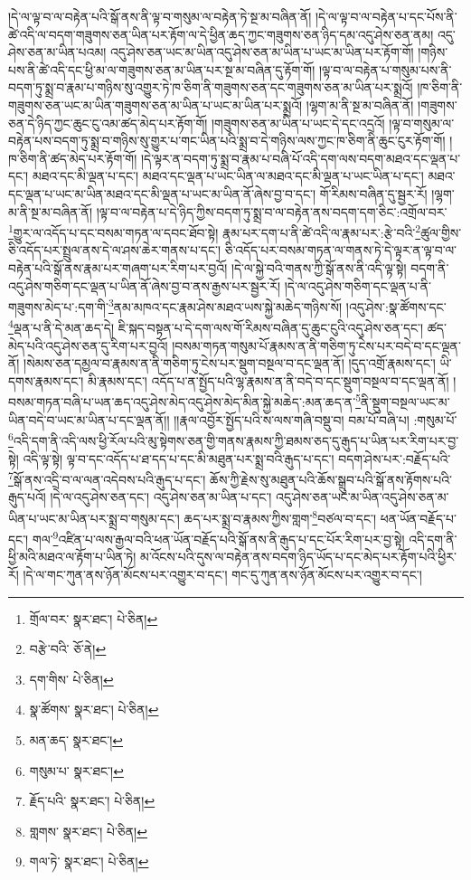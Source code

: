 །དེ་ལ་ལྟ་བ་ལ་བརྟེན་པའི་སྒོ་ནས་ནི་ལྟ་བ་གསུམ་ལ་བརྟེན་ཏེ་སྔ་མ་བཞིན་ནོ། །དེ་ལ་ལྟ་བ་ལ་བརྟེན་པ་དང་པོས་ནི་ཚེ་འདི་ལ་བདག་གཟུགས་ཅན་ཡིན་པར་རྟོག་ལ་དེ་ཕྱིན་ཆད་ཀྱང་གཟུགས་ཅན་ཉིད་དམ་འདུ་ཤེས་ཅན་ནམ། འདུ་ཤེས་ཅན་མ་ཡིན་པའམ། འདུ་ཤེས་ཅན་ཡང་མ་ཡིན་འདུ་ཤེས་ཅན་མ་ཡིན་པ་ཡང་མ་ཡིན་པར་རྟོག་གོ། །གཉིས་པས་ནི་ཚེ་འདི་དང་ཕྱི་མ་ལ་གཟུགས་ཅན་མ་ཡིན་པར་སྔ་མ་བཞིན་དུ་རྟོག་གོ། །ལྟ་བ་ལ་བརྟེན་པ་གསུམ་པས་ནི་བདག་ཏུ་སྨྲ་བ་རྣམ་པ་གཉིས་སུ་འགྱུར་ཏེ་ཁ་ཅིག་ནི་གཟུགས་ཅན་དང་གཟུགས་ཅན་མ་ཡིན་པར་སྨྲའོ། །ཁ་ཅིག་ནི་གཟུགས་ཅན་ཡང་མ་ཡིན་གཟུགས་ཅན་མ་ཡིན་པ་ཡང་མ་ཡིན་པར་སྨྲའོ། །ལྷག་མ་ནི་སྔ་མ་བཞིན་ནོ། །གཟུགས་ཅན་དེ་ཉིད་ཀྱང་ཆུང་ངུ་འམ་ཚད་མེད་པར་རྟོག་གོ། །གཟུགས་ཅན་མ་ཡིན་པ་ཡང་དེ་དང་འདྲའོ། །ལྟ་བ་གསུམ་ལ་བརྟེན་པས་བདག་ཏུ་སྨྲ་བ་གཉིས་སུ་གྱུར་པ་གང་ཡིན་པའི་སྨྲ་བ་དེ་གཉིས་ལས་ཀྱང་ཁ་ཅིག་ནི་ཆུང་ངུར་རྟོག་གོ། །
ཁ་ཅིག་ནི་ཚད་མེད་པར་རྟོག་གོ། །དེ་ལྟར་ན་བདག་ཏུ་སྨྲ་བ་རྣམ་པ་བཞི་པོ་འདི་དག་ལས་བདག་མཐའ་དང་ལྡན་པ་དང་། མཐའ་དང་མི་ལྡན་པ་དང་། མཐའ་དང་ལྡན་པ་ཡང་ཡིན་ལ་མཐའ་དང་མི་ལྡན་པ་ཡང་ཡིན་པ་དང་། མཐའ་དང་ལྡན་པ་ཡང་མ་ཡིན་མཐའ་དང་མི་ལྡན་པ་ཡང་མ་ཡིན་ནོ་ཞེས་བྱ་བ་དང་། གོ་རིམས་བཞིན་དུ་སྦྱར་རོ། །ལྷག་མ་ནི་སྔ་མ་བཞིན་ནོ། །ལྟ་བ་ལ་བརྟེན་པ་དེ་ཉིད་ཀྱིས་བདག་ཏུ་སྨྲ་བ་ལ་བརྟེན་ནས་བདག་དག་ཅིང་:འགྲོལ་བར་\footnote{གྲོལ་བར་  སྣར་ཐང་།  པེ་ཅིན། }གྱུར་ལ་འདོད་པ་དང་བསམ་གཏན་ལ་དབང་ཐོབ་སྟེ། རྣམ་པར་དག་པ་ནི་ཚེ་འདི་ལ་རྣམ་པར་:རྩེ་བའི་\footnote{བརྩེ་བའི་  ཅོ་ནེ། }ཚུལ་གྱིས་ཅི་འདོད་པར་སྤྲུལ་ནས་དེ་ལ་ཤས་ཆེར་གནས་པ་དང་། ཅི་འདོད་པར་བསམ་གཏན་ལ་གནས་ཏེ་དེ་ལྟར་ན་ལྟ་བ་ལ་བརྟེན་པའི་སྒོ་ནས་རྣམ་པར་གཞག་པར་རིག་པར་བྱའོ། །དེ་ལ་སྐྱེ་བའི་གནས་ཀྱི་སྒོ་ནས་ནི་འདི་ལྟ་སྟེ། བདག་ནི་འདུ་ཤེས་གཅིག་དང་ལྡན་པ་ཡིན་ནོ་ཞེས་བྱ་བ་ནས་རྒྱས་པར་སྦྱར་རོ། །དེ་ལ་འདུ་ཤེས་གཅིག་དང་ལྡན་པ་ནི་གཟུགས་མེད་པ་:དག་གི་\footnote{དག་གིས་  པེ་ཅིན། }ནམ་མཁའ་དང་རྣམ་ཤེས་མཐའ་ཡས་སྐྱེ་མཆེད་གཉིས་སོ། །འདུ་ཤེས་:སྣ་ཚོགས་དང་\footnote{སྣ་ཚོགས་  སྣར་ཐང་།  པེ་ཅིན། }ལྡན་པ་ནི་དེ་མན་ཆད་དེ། ཇི་སྐད་བསྟན་པ་དེ་དག་ལས་གོ་རིམས་བཞིན་དུ་ཆུང་ངུའི་འདུ་ཤེས་ཅན་དང་། ཚད་མེད་པའི་འདུ་ཤེས་ཅན་དུ་རིག་པར་བྱའོ། །བསམ་གཏན་གསུམ་པོ་རྣམས་ན་ནི་གཅིག་ཏུ་ངེས་པར་བདེ་བ་དང་ལྡན་ནོ། །སེམས་ཅན་དམྱལ་བ་རྣམས་ན་ནི་གཅིག་ཏུ་ངེས་པར་སྡུག་བསྔལ་བ་དང་ལྡན་ནོ། །དུད་འགྲོ་རྣམས་དང་། ཡི་དགས་རྣམས་དང་། མི་རྣམས་དང་། འདོད་པ་ན་སྤྱོད་པའི་ལྷ་རྣམས་ན་ནི་བདེ་བ་དང་སྡུག་བསྔལ་བ་དང་ལྡན་ནོ། །བསམ་གཏན་བཞི་པ་ཡན་ཆད་འདུ་ཤེས་མེད་འདུ་ཤེས་མེད་མིན་སྐྱེ་མཆེད་:མན་ཆད་ན་\footnote{མན་ཆད་  སྣར་ཐང་། }ནི་སྡུག་བསྔལ་ཡང་མ་ཡིན་བདེ་བ་ཡང་མ་ཡིན་པ་དང་ལྡན་ནོ།། །།རྣལ་འབྱོར་སྤྱོད་པའི་ས་ལས་གཞི་བསྡུ་བ། བམ་པོ་བཞི་པ། :གསུམ་པོ་\footnote{གསུམ་པ་  སྣར་ཐང་། }འདི་དག་ནི་འདི་ལས་ཕྱི་རོལ་པའི་མུ་སྟེགས་ཅན་གྱི་གནས་རྣམས་ཀྱི་ཐམས་ཅད་དུ་རྒུད་པ་ཡིན་པར་རིག་པར་བྱ་སྟེ། འདི་ལྟ་སྟེ། ལྟ་བ་དང་འདོད་པ་ཐ་དད་པ་དང་མི་མཐུན་པར་སྨྲ་བའི་རྒུད་པ་དང་། བདག་ཤེས་པར་:བརྗོད་པའི་\footnote{རྗོད་པའི་  སྣར་ཐང་།  པེ་ཅིན། }སྒོ་ནས་འདྲི་བ་ལ་ལན་འདེབས་པའི་རྒུད་པ་དང་། ཆོས་ཀྱི་རྗེས་སུ་མཐུན་པའི་ཆོས་སྒྲུབ་པའི་སྒོ་ནས་རྟོགས་པའི་རྒུད་པའོ། །དེ་ལ་འདུ་ཤེས་ཅན་དང་། འདུ་ཤེས་ཅན་མ་ཡིན་པ་དང་། འདུ་ཤེས་ཅན་ཡང་མ་ཡིན་འདུ་ཤེས་ཅན་མ་ཡིན་པ་ཡང་མ་ཡིན་པར་སྨྲ་བ་གསུམ་དང་། ཆད་པར་སྨྲ་བ་རྣམས་ཀྱིས་གླག་\footnote{གླགས་  སྣར་ཐང་།  པེ་ཅིན། }བཙལ་བ་དང་། ཕན་ཡོན་བརྗོད་པ་དང་། གལ་\footnote{གལ་ཏེ་  སྣར་ཐང་།  པེ་ཅིན། }འཛིན་པ་ལས་རྒྱལ་བའི་ཕན་ཡོན་བརྗོད་པའི་སྒོ་ནས་ནི་རྒུད་པ་དང་པོར་རིག་པར་བྱ་སྟེ། འདི་དག་ནི་ཕྱི་མའི་མཐའ་ལ་རྟོག་པ་ཡིན་ཏེ། མ་འོངས་པའི་དུས་ལ་བརྟེན་ནས་བདག་ཉིད་ཡོད་པ་དང་མེད་པར་རྟོག་པའི་ཕྱིར་རོ། །དེ་ལ་གང་ཀུན་ནས་ཉོན་མོངས་པར་འགྱུར་བ་དང་། གང་དུ་ཀུན་ནས་ཉོན་མོངས་པར་འགྱུར་བ་དང་། 